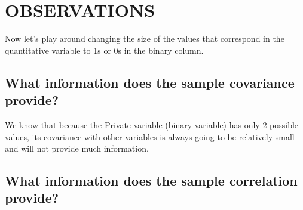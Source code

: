 \documentclass[]{article}
\begin{document}
\hypertarget{observations}{%
\section{OBSERVATIONS}\label{observations}}

Now let's play around changing the size of the values that correspond in
the quantitative variable to 1s or 0s in the binary column.

\hypertarget{what-information-does-the-sample-covariance-provide}{%
\subsection{What information does the sample covariance
provide?}\label{what-information-does-the-sample-covariance-provide}}

We know that because the Private variable (binary variable) has only 2
possible values, its covariance with other variables is always going to
be relatively small and will not provide much information.

\newpage

\hypertarget{what-information-does-the-sample-correlation-provide}{%
\subsection{What information does the sample correlation
provide?}\label{what-information-does-the-sample-correlation-provide}}
\end{document}
